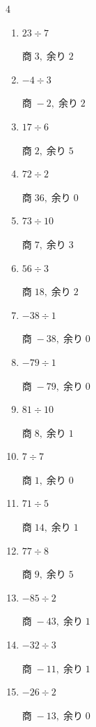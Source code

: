 \begin{multicols}{4}
\begin{enumerate}
  \item $23 \div 7$

        $商\; 3,\; 余り\; 2$

  \item $-4 \div 3$

        $商\; -2,\; 余り\; 2$

  \item $17 \div 6$

        $商\; 2,\; 余り\; 5$

  \item $72 \div 2$

        $商\; 36,\; 余り\; 0$

\columnbreak %

  \item $73 \div 10$

        $商\; 7,\; 余り\; 3$

  \item $56 \div 3$

        $商\; 18,\; 余り\; 2$

  \item $-38 \div 1$

        $商\; -38,\; 余り\; 0$

  \item $-79 \div 1$

        $商\; -79,\; 余り\; 0$

  \item $81 \div 10$

        $商\; 8,\; 余り\; 1$

  \item $7 \div 7$

        $商\; 1,\; 余り\; 0$

  \item $71 \div 5$

        $商\; 14,\; 余り\; 1$

  \item $77 \div 8$

        $商\; 9,\; 余り\; 5$

  \item $-85 \div 2$

        $商\; -43,\; 余り\; 1$

  \item $-32 \div 3$

        $商\; -11,\; 余り\; 1$

  \item $-26 \div 2$

        $商\; -13,\; 余り\; 0$


\end{enumerate}
\end{multicols}
